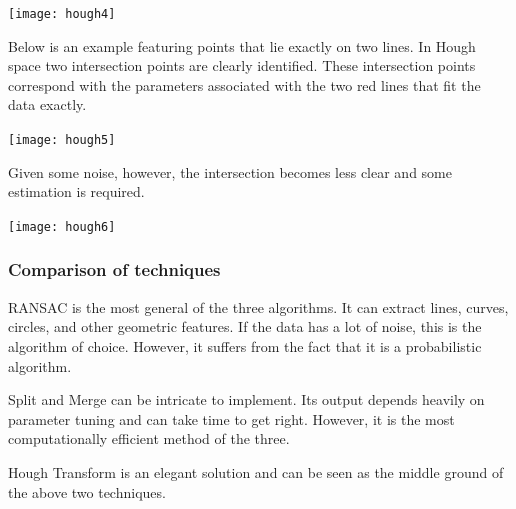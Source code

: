 \documentclass[twoside]{article}
\begin{document}
\begin{center}
	\texttt{[image: hough4]}
\end{center}

Below is an example featuring points that lie exactly on two lines. In Hough space two intersection points are clearly identified. These intersection points correspond with the parameters associated with the two red lines that fit the data exactly.

\begin{center}
	\texttt{[image: hough5]}
\end{center}

Given some noise, however, the intersection becomes less clear and some estimation is required.

\begin{center}
	\texttt{[image: hough6]}
\end{center}

\subsubsection{Comparison of techniques}
RANSAC is the most general of the three algorithms. It can extract lines, curves, circles, and other geometric features. If the data has a lot of noise, this is the algorithm of choice. However, it suffers from the fact that it is a probabilistic algorithm.

Split and Merge can be intricate to implement. Its output depends heavily on parameter tuning and can take time to get right. However, it is the most computationally efficient method of the three.

Hough Transform is an elegant solution and can be seen as the middle ground of the above two techniques.
\end{document}
